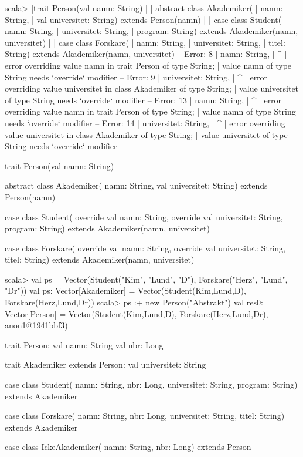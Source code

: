 \SubtaskSolved  
\begin{REPLnonum}
scala>  
     |trait Person(val namn: String)                                                                              
     | 
     | abstract class Akademiker(
     |   namn: String,
     |   val universitet: String) extends Person(namn)
     | 
     | case class Student(
     |   namn: String,
     |   universitet: String,
     |   program: String) extends Akademiker(namn, universitet)
     | 
     | case class Forskare(
     |   namn: String,
     |   universitet: String,
     |   titel: String) extends Akademiker(namn, universitet)
-- Error:     
8 |  namn: String,
  |  ^
  |  error overriding value namn in trait Person of type String;
  |    value namn of type String needs `override` modifier
-- Error:
9 |  universitet: String,
  |  ^
  |  error overriding value universitet in class Akademiker of type String;
  |    value universitet of type String needs `override` modifier
-- Error:
13 |  namn: String,
   |  ^
   |  error overriding value namn in trait Person of type String;
   |    value namn of type String needs `override` modifier
-- Error:
14 |  universitet: String,
   |  ^
   |  error overriding value universitet in class Akademiker of type String;
   |    value universitet of type String needs `override` modifier
\end{REPLnonum}

\begin{Code}
trait Person(val namn: String)

abstract class Akademiker(
  namn: String,
  val universitet: String) extends Person(namn)

case class Student(
  override val namn: String,
  override val universitet: String,
  program: String) extends Akademiker(namn, universitet)

case class Forskare(
  override val namn: String,
  override val universitet: String,
  titel: String) extends Akademiker(namn, universitet)
\end{Code}

\begin{REPLsmall}
scala> val ps = Vector(Student("Kim", "Lund", "D"), Forskare("Herz", "Lund", "Dr"))
val ps: Vector[Akademiker] = Vector(Student(Kim,Lund,D), Forskare(Herz,Lund,Dr))
scala> ps :+ new Person("Abstrakt") {}
val res0: Vector[Person] = 
  Vector(Student(Kim,Lund,D), Forskare(Herz,Lund,Dr), anon1@1941bbf3)
\end{REPLsmall}

\SubtaskSolved
\begin{Code}
trait Person: 
  val namn: String 
  val nbr: Long

trait Akademiker extends Person:
  val universitet: String

case class Student(
  namn: String,
  nbr: Long,
  universitet: String,
  program: String) extends Akademiker

case class Forskare(
  namn: String,
  nbr: Long,
  universitet: String,
  titel: String) extends Akademiker

case class IckeAkademiker(
    namn: String,
    nbr: Long) extends Person
\end{Code}



